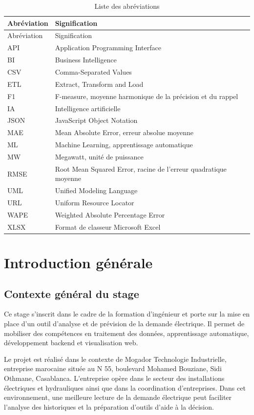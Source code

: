 \documentclass[12pt,a4paper]{report}
\begin{document}
\begin{longtable}{p{} p{}}
\caption{Liste des abréviations}\label{tab:abreviations}\\
\toprule
Abréviation & Signification \\
\midrule
\endfirsthead
\toprule
Abréviation & Signification \\
\midrule
\endhead
API & Application Programming Interface \\
BI & Business Intelligence \\
CSV & Comma-Separated Values \\
ETL & Extract, Transform and Load \\
F1 & F-measure, moyenne harmonique de la précision et du rappel \\
IA & Intelligence artificielle \\
JSON & JavaScript Object Notation \\
MAE & Mean Absolute Error, erreur absolue moyenne \\
ML & Machine Learning, apprentissage automatique \\
MW & Megawatt, unité de puissance \\
RMSE & Root Mean Squared Error, racine de l'erreur quadratique moyenne \\
UML & Unified Modeling Language \\
URL & Uniform Resource Locator \\
WAPE & Weighted Absolute Percentage Error \\
XLSX & Format de classeur Microsoft Excel \\
\bottomrule
\end{longtable}

\chapter{Introduction générale}

\section{Contexte général du stage}

Ce stage s'inscrit dans le cadre de la formation d'ingénieur et porte sur la
mise en place d'un outil d'analyse et de prévision de la demande électrique.
Il permet de mobiliser des compétences en traitement des données,
apprentissage automatique, développement backend et visualisation web.

Le projet est réalisé dans le contexte de Mogador Technologie Industrielle,
entreprise marocaine située au N 55, boulevard Mohamed Bouziane, Sidi
Othmane, Casablanca. L'entreprise opère dans le secteur des installations
électriques et hydrauliques ainsi que dans la coordination d'entreprises.
Dans cet environnement, une meilleure lecture de la demande électrique peut
faciliter l'analyse des historiques et la préparation d'outils d'aide à la
décision.
\end{document}
